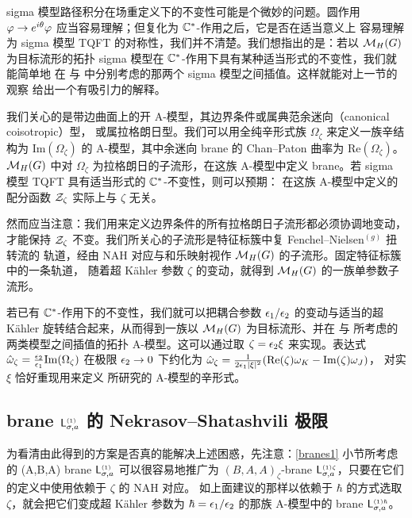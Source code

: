 sigma 模型路径积分在场重定义下的不变性可能是个微妙的问题。圆作用
$\varphi\to e^{i\theta}\varphi$ 应当容易理解；但复化为 $\mathbb{C}^*$-作用之后，它是否在适当意义上
容易理解为 sigma 模型 TQFT 的对称性，我们并不清楚。我们想指出的是：若以 $\mathcal{M}_H(G)$
为目标流形的拓扑 sigma 模型在 $\mathbb{C}^*$-作用下具有某种适当形式的不变性，我们就能简单地
在 \cite{KW} 与 \cite{NW} 中分别考虑的那两个 sigma 模型之间插值。这样就能对上一节的观察
给出一个有吸引力的解释。

我们关心的是带边曲面上的开 A-模型，其边界条件或属典范余迷向（canonical coisotropic）型，
或属拉格朗日型。我们可以用全纯辛形式族 $\Omega_{\zeta}$ 来定义一族辛结构为
$\mathrm{Im}(\Omega_\zeta)$ 的 A-模型，其中余迷向 brane 的 Chan--Paton 曲率为
$\mathrm{Re}(\Omega_\zeta)$。$\mathcal{M}_H(G)$ 中对 $\Omega_\zeta$ 为拉格朗日的子流形，在这族
A-模型中定义 brane。若 sigma 模型 TQFT 具有适当形式的 $\mathbb{C}^*$-不变性，则可以预期：
在这族 A-模型中定义的配分函数 $\mathcal{Z}_\zeta$ 实际上与 $\zeta$ 无关。

然而应当注意：我们用来定义边界条件的所有拉格朗日子流形都必须协调地变动，才能保持
$\mathcal{Z}_{\zeta}$ 不变。我们所关心的子流形是特征标簇中复 Fenchel--Nielsen$^{(g)}$ 扭转流的
轨道，经由 NAH 对应与和乐映射视作 $\mathcal{M}_H(G)$ 的子流形。固定特征标簇中的一条轨道，
随着超 Kähler 参数 $\zeta$ 的变动，就得到 $\mathcal{M}_H(G)$ 的一族单参数子流形。

若已有 $\mathbb{C}^*$-作用下的不变性，我们就可以把耦合参数 $\epsilon_1/\epsilon_2$ 的变动与适当的超 Kähler
旋转结合起来，从而得到一族以 $\mathcal{M}_H(G)$ 为目标流形、并在 \cite{NW} 与 \cite{KW} 所考虑的
两类模型之间插值的拓扑 A-模型。这可以通过取 $\zeta=\epsilon_2\xi$ 来实现。表达式
$\hat{\omega}_\zeta=\frac{\epsilon_2}{\epsilon_1}\mathrm{Im}(\Omega_{\zeta})$ 在极限
$\epsilon_2\to 0$ 下约化为 $\hat{\omega}_\zeta=
\frac{1}{2\epsilon_1|\xi|^2}
(\mathrm{Re}(\zeta)\omega_K-\mathrm{Im}(\zeta)\omega_J)$，
对实 $\xi$ 恰好重现用来定义 \cite{KW} 所研究的 A-模型的辛形式。

\subsection{brane $\mathsf{L}_{\sigma,a}^{\scriptscriptstyle (1)}$ 的 Nekrasov--Shatashvili 极限} \label{SecNSlim}

为看清由此得到的方案是否真的能解决上述困惑，先注意：\ref{branes1} 小节所考虑的 (A,B,A)
brane $\mathsf{L}_{\sigma,a}^{\scriptscriptstyle (1)}$ 可以很容易地推广为 $(B,A,A)_\zeta$-brane
$\mathsf{L}_{\sigma,a}^{\scriptscriptstyle (1)\zeta}$，只要在它们的定义中使用依赖于 $\zeta$ 的 NAH 对应。
如上面建议的那样以依赖于 $\hbar$ 的方式选取 $\zeta$，就会把它们变成超 Kähler 参数为
$\hbar=\epsilon_1/\epsilon_2$ 的那族 A-模型中的 brane $\mathsf{L}_{\sigma,a}^{\scriptscriptstyle (1)\hbar}$。

